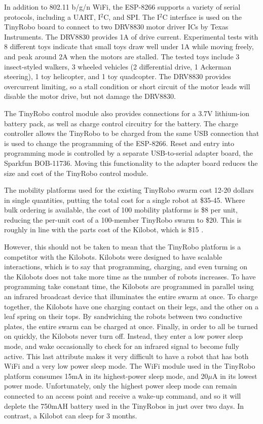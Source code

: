 \documentclass[]{article}
\begin{document}
In addition to 802.11 b/g/n WiFi, the ESP-8266 supports a variety of serial protocols, including a UART, I$^2$C, and SPI. 
The I$^2$C interface is used on the TinyRobo board to connect to two DRV8830 motor driver ICs by Texas Instruments. 
The DRV8830 provides 1A of drive current.
Experimental tests with 8 different toys indicate that small toys draw well under 1A while moving freely, and peak around 2A when the motors are stalled. 
The tested toys include 3 insect-styled walkers, 3 wheeled vehicles (2 differential drive, 1 Ackerman steering), 1 toy helicopter, and 1 toy quadcopter.
The DRV8830 provides overcurrent limiting, so a stall condition or short circuit of the motor leads will disable the motor drive, but not damage the DRV8830. 

The TinyRobo control module also provides connections for a 3.7V lithium-ion battery pack, as well as charge control circuitry for the battery. 
The charge controller allows the TinyRobo to be charged from the same USB connection that is used to change the programming of the ESP-8266. 
Reset and entry into programming mode is controlled by a separate USB-to-serial adapter board, the Sparkfun BOB-11736.
Moving this functionality to the adapter board reduces the size and cost of the TinyRobo control module. 

The mobility platforms used for the existing TinyRobo swarm cost 12-20 dollars in single quantities, putting the total cost for a single robot at \$35-45.
Where bulk ordering is available, the cost of 100 mobility platforms is \$8 per unit, reducing the per-unit cost of a 100-member TinyRobo swarm to \$20. 
This is roughly in line with the parts cost of the Kilobot, which is \$15 \cite{rubenstein2014kilobot}.

However, this should not be taken to mean that the TinyRobo platform is a competitor with the Kilobots. 
Kilobots were designed to have scalable interactions, which is to say that programming, charging, and even turning on the Kilobots does not take more time as the number of robots increases. 
To have programming take constant time, the Kilobots are programmed in parallel using an infrared broadcast device that illuminates the entire swarm at once. 
To charge together, the Kilobots have one charging contact on their legs, and the other on a leaf spring on their tops. 
By sandwiching the robots between two conductive plates, the entire swarm can be charged at once.
Finally, in order to all be turned on quickly, the Kilobots never turn off.  
Instead, they enter a low power sleep mode, and wake occasionally to check for an infrared signal to become fully active. 
This last attribute makes it very difficult to have a robot that has both WiFi and a very low power sleep mode. 
The WiFi module used in the TinyRobo platform consumes 15mA in its highest-power sleep mode, and 20$\mu$A in its lowest power mode. 
Unfortunately, only the highest power sleep mode can remain connected to an access point and receive a wake-up command, and so it will deplete the 750mAH battery used in the TinyRobos in just over two days. 
In contrast, a Kilobot can sleep for 3 months. 
\end{document}
